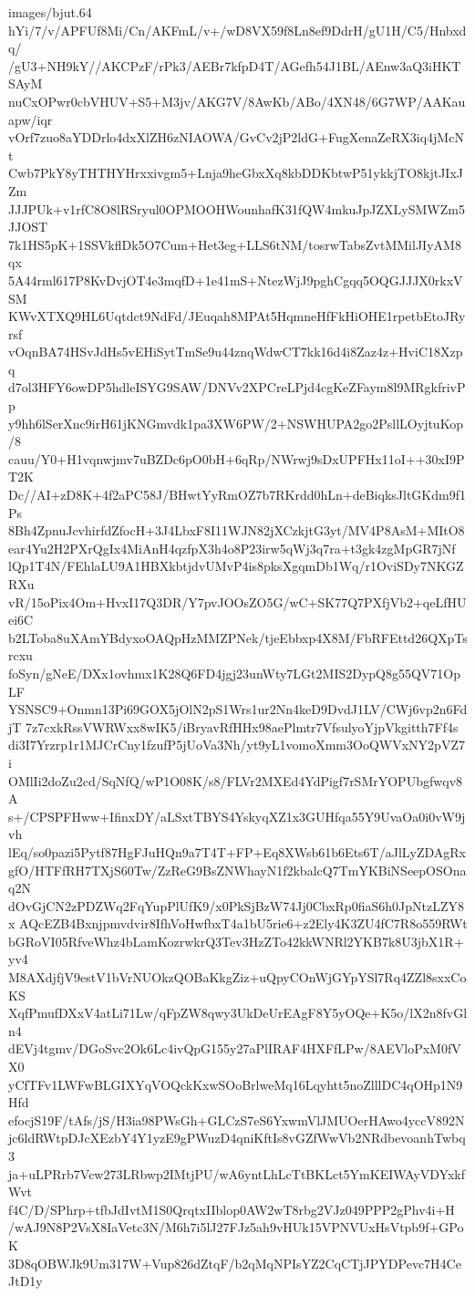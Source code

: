 \begin{filecontents*}{images/bjut.64}
hYi/7/v/APFUf8Mi/Cn/AKFmL/v+/wD8VX59f8Ln8ef9DdrH/gU1H/C5/Hnbxdq/
/gU3+NH9kY//AKCPzF/rPk3/AEBr7kfpD4T/AGefh54J1BL/AEnw3aQ3iHKTSAyM
nuCxOPwr0cbVHUV+S5+M3jv/AKG7V/8AwKb/ABo/4XN48/6G7WP/AAKauapw/iqr
vOrf7zuo8aYDDrlo4dxXlZH6zNIAOWA/GvCv2jP2ldG+FugXenaZeRX3iq4jMcNt
Cwb7PkY8yTHTHYHrxxivgm5+Lnja9heGbxXq8kbDDKbtwP51ykkjTO8kjtJIxJZm
JJJPUk+v1rfC8O8lRSryul0OPMOOHWounhafK31fQW4mkuJpJZXLySMWZm5JJOST
7k1HS5pK+1SSVkflDk5O7Cum+Het3eg+LLS6tNM/tosrwTabsZvtMMilJIyAM8qx
5A44rml617P8KvDvjOT4e3mqfD+1e41mS+NtezWjJ9pghCgqq5OQGJJJX0rkxVSM
KWvXTXQ9HL6Uqtdct9NdFd/JEuqah8MPAt5HqmneHfFkHiOHE1rpetbEtoJRyrsf
vOqnBA74HSvJdHs5vEHiSytTmSe9u44znqWdwCT7kk16d4i8Zaz4z+HviC18Xzpq
d7ol3HFY6owDP5hdleISYG9SAW/DNVv2XPCreLPjd4cgKeZFaym8l9MRgkfrivPp
y9hh6lSerXnc9irH61jKNGmvdk1pa3XW6PW/2+NSWHUPA2go2PsllLOyjtuKop/8
cauu/Y0+H1vqnwjmv7uBZDc6pO0bH+6qRp/NWrwj9sDxUPFHx11oI++30xI9PT2K
Dc//AI+zD8K+4f2aPC58J/BHwtYyRmOZ7b7RKrdd0hLn+deBiqksJltGKdm9f1Ps
8Bh4ZpnuJcvhirfdZfocH+3J4LbxF8I11WJN82jXCzkjtG3yt/MV4P8AsM+MItO8
ear4Yu2H2PXrQgIx4MiAnH4qzfpX3h4o8P23irw5qWj3q7ra+t3gk4zgMpGR7jNf
lQp1T4N/FEhlaLU9A1HBXkbtjdvUMvP4is8pksXgqmDb1Wq/r1OviSDy7NKGZRXu
vR/15oPix4Om+HvxI17Q3DR/Y7pvJOOsZO5G/wC+SK77Q7PXfjVb2+qeLfHUei6C
b2LToba8uXAmYBdyxoOAQpHzMMZPNek/tjeEbbxp4X8M/FbRFEttd26QXpTsrcxu
foSyn/gNeE/DXx1ovhmx1K28Q6FD4jgj23unWty7LGt2MIS2DypQ8g55QV71OpLF
YSNSC9+Onmn13Pi69GOX5jOlN2pS1Wrs1ur2Nn4keD9DvdJ1LV/CWj6vp2n6FdjT
7z7cxkRssVWRWxx8wIK5/iBryavRfHHx98aePlmtr7VfsulyoYjpVkgitth7Ff4s
di3I7Yrzrp1r1MJCrCny1fzufP5jUoVa3Nh/yt9yL1vomoXmm3OoQWVxNY2pVZ7i
OMlIi2doZu2cd/SqNfQ/wP1O08K/s8/FLVr2MXEd4YdPigf7rSMrYOPUbgfwqv8A
s+/CPSPFHww+IfinxDY/aLSxtTBYS4YskyqXZ1x3GUHfqa55Y9UvaOa0i0vW9jvh
lEq/so0pazi5Pytf87HgFJuHQn9a7T4T+FP+Eq8XWsb61b6Ets6T/aJlLyZDAgRx
gfO/HTFfRH7TXjS60Tw/ZzReG9BsZNWhayN1f2kbalcQ7TmYKBiNSeepOSOnaq2N
dOvGjCN2zPDZWq2FqYupPlUfK9/x0PkSjBzW74Jj0CbxRp0fiaS6h0JpNtzLZY8x
AQcEZB4Bxnjpmvdvir8IfhVoHwfbxT4a1bU5rie6+z2Ely4K3ZU4fC7R8o559RWt
bGRoVI05RfveWhz4bLamKozrwkrQ3Tev3HzZTo42kkWNRl2YKB7k8U3jbX1R+yv4
M8AXdjfjV9estV1bVrNUOkzQOBaKkgZiz+uQpyCOnWjGYpYSl7Rq4ZZl8sxxCoKS
XqfPmufDXxV4atLi71Lw/qFpZW8qwy3UkDeUrEAgF8Y5yOQe+K5o/lX2n8fvGln4
dEVj4tgmv/DGoSvc2Ok6Lc4ivQpG155y27aPlIRAF4HXFfLPw/8AEVloPxM0fVX0
yCfTFv1LWFwBLGIXYqVOQckKxwSOoBrlweMq16Lqyhtt5noZlllDC4qOHp1N9Hfd
efocjS19F/tAfs/jS/H3ia98PWsGh+GLCzS7eS6YxwmVlJMUOerHAwo4yccV892N
jc6ldRWtpDJcXEzbY4Y1yzE9gPWuzD4qniKftIs8vGZfWwVb2NRdbevoanhTwbq3
ja+uLPRrb7Vcw273LRbwp2IMtjPU/wA6yntLhLcTtBKLct5YmKEIWAyVDYxkfWvt
f4C/D/SPhrp+tfbJdIvtM1S0QrqtxIIblop0AW2wT8rbg2VJz049PPP2gPhv4i+H
/wAJ9N8P2VsX8IaVetc3N/M6h7i5lJ27FJz5ah9vHUk15VPNVUxHsVtpb9f+GPoK
3D8qOBWJk9Um317W+Vup826dZtqF/b2qMqNPIsYZ2CqCTjJPYDPevc7H4CeJtD1y

\end{filecontents*}
